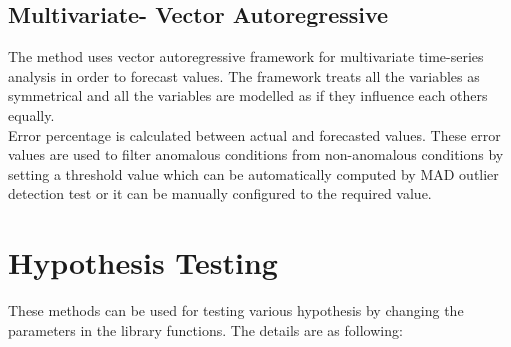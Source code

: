 \subsection{Multivariate- Vector Autoregressive}
The method uses vector autoregressive framework for multivariate time-series analysis in order to forecast values. The framework treats all the variables as symmetrical and all the variables are modelled as if they influence each others equally.
\\
Error percentage is calculated between actual and forecasted values. These error values are used to filter anomalous conditions from non-anomalous conditions by setting a threshold value which can be automatically computed by MAD outlier detection test or it can be manually configured to the required value.

\section{Hypothesis Testing}
These methods can be used for testing various hypothesis by changing the parameters in the library functions. The details are as following:

